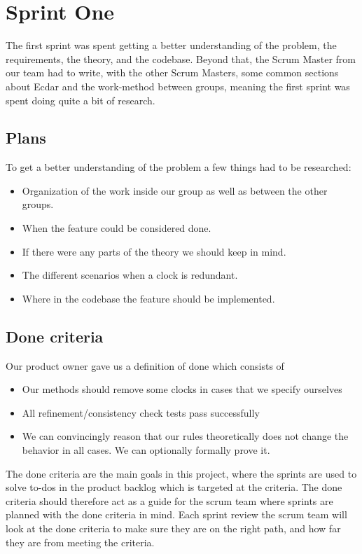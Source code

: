 \section{Sprint One}
The first sprint was spent getting a better understanding of the problem, the requirements, the theory, and the codebase. Beyond that, the Scrum Master from our team had to write, with the other Scrum Masters, some common sections about Ecdar and the work-method between groups, meaning the first sprint was spent doing quite a bit of research.

\subsection{Plans}
To get a better understanding of the problem a few things had to be researched:
\begin{itemize}
    \item Organization of the work inside our group as well as between the other groups.
    \item When the feature could be considered done.
    \item If there were any parts of the theory we should keep in mind.
    \item The different scenarios when a clock is redundant.
    \item Where in the codebase the feature should be implemented.
\end{itemize}

\subsection{Done criteria}
Our product owner gave us a definition of done which consists of
\begin{itemize}
    \item Our methods should remove some clocks in cases that we specify ourselves
    \item All refinement/consistency check tests pass successfully
    \item We can convincingly reason that our rules theoretically does not change the behavior in all cases. We can optionally formally prove it.
\end{itemize}

The done criteria are the main goals in this project, where the sprints are used to solve to-dos in the product backlog which is targeted at the criteria. The done criteria should therefore act as a guide for the scrum team where sprints are planned with the done criteria in mind. Each sprint review the scrum team will look at the done criteria to make sure they are on the right path, and how far they are from meeting the criteria.

